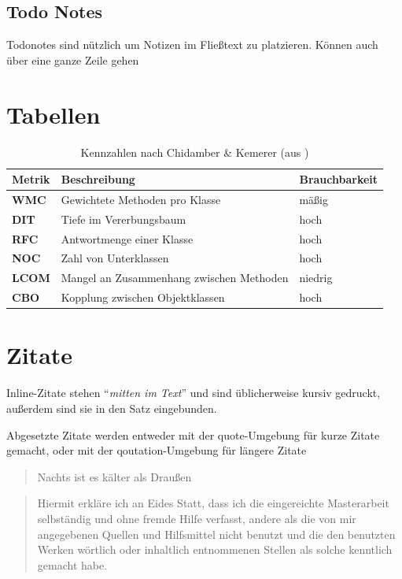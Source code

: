 \subsection{Todo Notes}
 Todonotes sind nützlich um Notizen im Fließtext zu platzieren. Können auch über eine ganze Zeile gehen

\section{Tabellen}
\blindtext
\begin{table}[h]
	\centering
	\begin{tabular}{|l|l|l|}
\hline 
		Metrik 		  &Beschreibung 								&  Brauchbarkeit\\ 
\hline  
		\textbf{WMC}  &Gewichtete Methoden pro Klasse 				&  mäßig 		\\ 
\hline  
		\textbf{DIT}  &Tiefe im Vererbungsbaum 						&  hoch 		\\ 
\hline  
		\textbf{RFC}  &Antwortmenge einer Klasse 					&  hoch 		\\ 
\hline 
		\textbf{NOC}  &Zahl von Unterklassen 						&  hoch 		\\ 
\hline  
		\textbf{LCOM} &Mangel an Zusammenhang zwischen Methoden 	&  niedrig  	\\ 
\hline  
		\textbf{CBO}  &Kopplung zwischen Objektklassen 				&  hoch  		\\ 
\hline 
	\end{tabular} 
	\caption{Kennzahlen nach Chidamber \& Kemerer (aus \cite{Prech1999})}
	\label{tab:metrik}
\end{table}


\section{Zitate}

Inline-Zitate stehen \enquote{\emph{mitten im Text}} und sind üblicherweise kursiv gedruckt, außerdem sind sie in den Satz eingebunden.

Abgesetzte Zitate werden entweder mit der quote-Umgebung für kurze Zitate gemacht, oder mit der qoutation-Umgebung für längere Zitate

\begin{quote}
Nachts ist es kälter als Draußen
\end{quote}


\begin{quotation}
Hiermit erkläre ich an Eides Statt, dass ich die eingereichte Masterarbeit
				selbständig und ohne fremde Hilfe verfasst, andere als die von mir angegebenen Quellen
				und Hilfsmittel nicht benutzt und die den benutzten Werken wörtlich oder
				inhaltlich entnommenen Stellen als solche kenntlich gemacht habe. 
\end{quotation}

